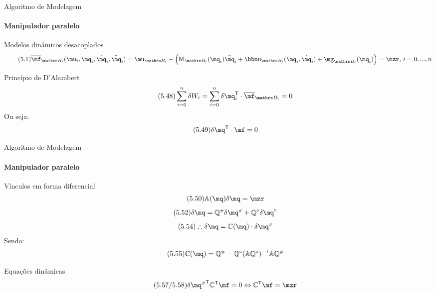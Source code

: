 \documentclass[25pt,landscape]{beamer}
\begin{document}
\begin{frame}{Algoritmo de Modelagem}
    \framesubtitle{Manipulador paralelo}
    \begin{block}{Modelos dinâmicos desacoplados}
    	\begin{equation} \label{eq:ModeloDosSubsistemas} \tag{5.1}
			\overline{\mf}_{\ssB_i}(\mu_i, \mq_i, \dot{\mq}_i, \ddot{\mq}_i) =  \mu_{\ssB_i} - \Big(\mM_{\ssB_i}(\mq_i) \ddot{\mq}_i + \mnu_{\ssB_i}(\mq_i,\dot{\mq}_i) + \mg_{\ssB_i}(\mq_i)\Big) = \mzr, \, i = 0,...,n
		\end{equation}
    \end{block}
    \pause
    \begin{block}{Princípio de D'Alambert}
    	\begin{equation} \tag{5.48}
			\sum_{i=0}^n \delta W_i = \sum_{i=0}^n \delta \mq_i^\msT \cdot \overline{\mf}_{\ssB_i} = 0
		\end{equation}
		\pause
		Ou seja:
		\begin{equation} \label{eq:DAlambertParalelos} \tag{5.49}
			\delta \mq^\msT \cdot \mf = 0
		\end{equation}
    \end{block}
\end{frame}

\begin{frame}{Algoritmo de Modelagem}
    \framesubtitle{Manipulador paralelo}
    \begin{block}{Vínculos em forma diferencial}
    \pause
    	\begin{equation} \label{eq:Adeltaq} \tag{5.50}
			\mA(\mq) \delta \mq = \mzr
		\end{equation}
	    \pause
		\begin{equation} \label{eq:deltaQsshQcir} \tag{5.52}
			\delta\mq = \mQ\ssh \delta\mq\ssh + \mQ\cir \delta\mq\cir
		\end{equation}
		\pause
		\begin{equation} \label{eq:deltamqC} \tag{5.54}
			\therefore \delta \mq = \mC(\mq) \cdot \delta\mq\ssh
		\end{equation}
		\pause
		Sendo:
		\begin{equation} \label{eq:CComplemento} \tag{5.55}
			\mC(\mq) = \mQ\ssh - \mQ\cir (\mA \mQ\cir)^{-1} \mA \mQ\ssh 
		\end{equation}
    \end{block}
    \pause
    \begin{block}{Equações dinâmicas}
    	\begin{equation} \tag{5.57/5.58}
			\delta {\mq\ssh}^\msT \mC^\msT \mf = 0 \Leftrightarrow \mC^\msT \mf = \mzr
		\end{equation}
    \end{block}
\end{frame}
\end{document}
